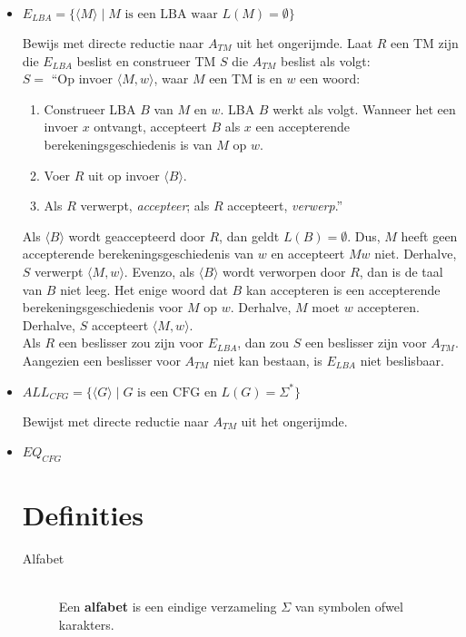 \documentclass[]{article}
\begin{document}
\begin{itemize}
	
	\item $E_{LBA} = \{ \langle M \rangle \mid M \mbox{ is een LBA waar } L(M) = \emptyset \}$
	
	Bewijs met directe reductie naar $A_{TM}$ uit het ongerijmde.
	Laat $R$ een TM zijn die $E_{LBA}$ beslist en construeer TM $S$ die $A_{TM}$ beslist als volgt: \\	
	$S = $ ``Op invoer $\langle M, w \rangle$, waar $M$ een TM is en $w$ een woord:
	\begin{enumerate}
		\item Construeer LBA $B$ van $M$ en $w$. LBA $B$ werkt als volgt. Wanneer het een invoer $x$ ontvangt, accepteert $B$ als $x$ een accepterende berekeningsgeschiedenis is van $M$ op $w$.
		\item Voer $R$ uit op invoer $\langle B \rangle$.
		\item Als $R$ verwerpt, \emph{accepteer}; als $R$ accepteert, \emph{verwerp}.''
	\end{enumerate}
	Als $\langle B \rangle$ wordt geaccepteerd door $R$, dan geldt $L(B) = \emptyset$. Dus, $M$ heeft geen accepterende berekeningsgeschiedenis van $w$ en accepteert $M w$ niet. Derhalve, $S$ verwerpt $\langle M, w \rangle$. Evenzo, als $\langle B \rangle$ wordt verworpen door $R$, dan is de taal van $B$ niet leeg. Het enige woord dat $B$ kan accepteren is een accepterende berekeningsgeschiedenis voor $M$ op $w$. Derhalve, $M$ moet $w$ accepteren. Derhalve, $S$ accepteert $\langle M, w \rangle$. \\
	Als $R$ een beslisser zou zijn voor $E_{LBA}$, dan zou $S$ een beslisser zijn voor $A_{TM}$. Aangezien een beslisser voor $A_{TM}$ niet kan bestaan, is $E_{LBA}$ niet beslisbaar.
	
	
	\item $ALL_{CFG} = \{ \langle G \rangle \mid G \mbox{ is een CFG en } L(G) = \Sigma^* \}$
	
	Bewijst met directe reductie naar $A_{TM}$ uit het ongerijmde.
	
	
	\item $EQ_{CFG}$
		
\section*{Definities}
\begin{description}
	\item[Alfabet] \hfill \\
	Een \textbf{alfabet} is een eindige verzameling $\Sigma$ van symbolen ofwel karakters.
	

\end{description}
\end{itemize}
\end{document}
